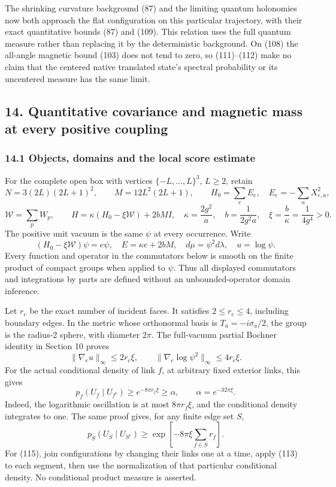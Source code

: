 \documentclass[
  11pt,
]{article}
\begin{document}
The shrinking curvature background (87) and the limiting quantum
holonomies now both approach the flat configuration on this particular
trajectory, with their exact quantitative bounds (87) and (109). This
relation uses the full quantum measure rather than replacing it by the
deterministic background. On (108) the all-angle magnetic bound (103)
does not tend to zero, so (111)--(112) make no claim that the centered
native translated state's spectral probability or its uncentered measure
has the same limit.

\subsection{14. Quantitative covariance and magnetic mass at every
positive
coupling}\label{quantitative-covariance-and-magnetic-mass-at-every-positive-coupling}

\subsubsection{14.1 Objects, domains and the local score
estimate}\label{objects-domains-and-the-local-score-estimate}

For the complete open box with vertices \(\{-L,\ldots,L\}^3\),
\(L\ge2\), retain \[
 N=3(2L)(2L+1)^2,\qquad M=12L^2(2L+1),
 \qquad H_0=\sum_eE_e,\quad E_e=-\sum_aX_{e,a}^2,
\] \[
 \mathcal W=\sum_p W_p,\qquad
 H=\kappa(H_0-\xi\mathcal W)+2bMI,
 \quad \kappa=\frac{2g^2}{a},\quad b=\frac1{2g^2a},
 \quad \xi=\frac b\kappa=\frac1{4g^4}>0.
\] The positive unit vacuum is the same \(\psi\) at every occurrence.
Write \[
 (H_0-\xi\mathcal W)\psi=e\psi,\quad
 E=\kappa e+2bM,\quad d\mu=\psi^2d\lambda,
 \quad u=\log\psi.
\] Every function and operator in the commutators below is smooth on the
finite product of compact groups when applied to \(\psi\). Thus all
displayed commutators and integrations by parts are defined without an
unbounded-operator domain inference.

Let \(r_e\) be the exact number of incident faces. It satisfies
\(2\le r_e\le4\), including boundary edges. In the metric whose
orthonormal basis is \(T_a=-i\sigma_a/2\), the group is the radius-2
sphere, with diameter \(2\pi\). The full-vacuum partial Bochner identity
in Section 10 proves \[
 \lVert\nabla_eu\rVert_\infty\le2r_e\xi,
 \qquad
 \lVert\nabla_e\log\psi^2\rVert_\infty\le4r_e\xi.
 \tag{113}
\] For the actual conditional density of link \(f\), at arbitrary fixed
exterior links, this gives \[
 p_f(U_f\mid U_{f^c})\ge e^{-8\pi r_f\xi}
 \ge\alpha,\qquad \alpha=e^{-32\pi\xi}.
 \tag{114}
\] Indeed, the logarithmic oscillation is at most \(8\pi r_f\xi\), and
the conditional density integrates to one. The same proof gives, for any
finite edge set \(S\), \[
 p_S(U_S\mid U_{S^c})\ge
 \exp\!\left[-8\pi\xi\sum_{f\in S}r_f\right].
 \tag{115}
\] For (115), join configurations by changing their links one at a time,
apply (113) to each segment, then use the normalization of that
particular conditional density. No conditional product measure is
asserted.
\end{document}
